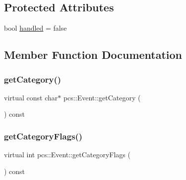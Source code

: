\subsection*{Protected Attributes}
\begin{DoxyCompactItemize}
\item 
bool \hyperlink{classpcs_1_1Event_a24acdd6f068d4b4bbc61cab76f59e0ed}{handled} = false
\end{DoxyCompactItemize}


\subsection{Member Function Documentation}
\mbox{\label{classpcs_1_1Event_a066245823d5a005204574bccd544d8dd}} 
\subsubsection{\texorpdfstring{get\+Category()}{getCategory()}}
{\footnotesize\ttfamily virtual const char$\ast$ pcs\+::\+Event\+::get\+Category (\begin{DoxyParamCaption}{ }\end{DoxyParamCaption}) const\hspace{0.3cm}{\ttfamily [pure virtual]}}

\mbox{\label{classpcs_1_1Event_a1cdcf7b0410496912c19417f72caed48}} 
\subsubsection{\texorpdfstring{get\+Category\+Flags()}{getCategoryFlags()}}
{\footnotesize\ttfamily virtual int pcs\+::\+Event\+::get\+Category\+Flags (\begin{DoxyParamCaption}{ }\end{DoxyParamCaption}) const\hspace{0.3cm}{\ttfamily [pure virtual]}}

\mbox{\label{classpcs_1_1Event_a08392dd589a27532532b61103af6f291}} 
